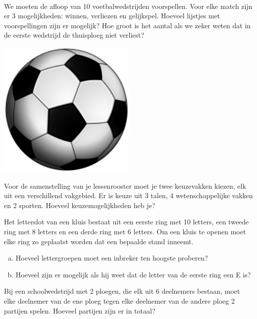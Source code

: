 \documentclass[12pt,a4paper,twoside]{article}
\begin{document}
\begin{oefening}\\
\begin{minipage}[]{0.7\textwidth}
We moeten de afloop van 10 voetbalwedstrijden voorspellen. Voor elke match zijn er 3 mogelijkheden: winnen, verliezen en gelijkspel. Hoeveel lijstjes met voorspellingen zijn er mogelijk? Hoe groot is het aantal als we zeker weten dat in de eerste wedstrijd de thuisploeg niet verliest?
\end{minipage}
\begin{minipage}[]{0.29\textwidth}
  \centering
  \includegraphics[width=0.5\textwidth]{voetbal}
\end{minipage}
\end{oefening}

\begin{oefening}
Voor de samenstelling van je lessenrooster moet je twee keuzevakken kiezen, elk uit een verschillend vakgebied. Er is keuze uit 3 talen, 4 wetenschappelijke vakken en 2 sporten. Hoeveel keuzemogelijkheden heb je?
\end{oefening}

\begin{oefening}
Het letterslot van een kluis bestaat uit een eerste ring met 10 letters, een tweede ring met 8 letters en een derde ring met 6 letters. Om een kluis te openen moet elke ring zo geplaatst worden dat een bepaalde stand inneemt.
\begin{enumerate}[(a)]
  \item Hoeveel lettergroepen moet een inbreker ten hoogste proberen?
  \item Hoeveel zijn er mogelijk als hij weet dat de letter van de eerste ring een E is?
\end{enumerate}
\end{oefening}

\begin{oefening}
Bij een schoolwedstrijd met 2 ploegen, die elk uit 6 deelnemers bestaan, moet elke deelnemer van de ene ploeg tegen elke deelnemer van de andere ploeg 2 partijen spelen. Hoeveel partijen zijn er in totaal?
\end{oefening}
\end{document}

